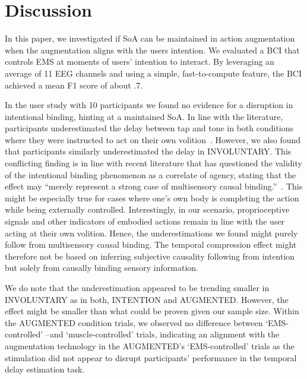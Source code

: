 \section{Discussion}
In this paper, we investigated if SoA can be maintained in action augmentation when the augmentation aligns with the users intention. We evaluated a BCI that controls EMS at moments of users' intention to interact. By leveraging an average of 11 EEG channels and using a simple, fast-to-compute feature, the BCI achieved a mean F1 score of about .7. 


In the user study with 10 participants we found no evidence for a disruption in intentional binding, hinting at a maintained SoA. In line with the literature, participants underestimated the delay between tap and tone in both conditions where they were instructed to act on their own volition~\cite{Moore2012-dk}. However, we also found that participants similarly underestimated the delay in INVOLUNTARY. This conflicting finding is in line with recent literature that has questioned the validity of the intentional binding phenomenon as a correlate of agency, stating that the effect may ``merely represent a strong case of multisensory causal binding.''~\cite{Suzuki2019-pi, Gutzeit2023-ei, Hoerl2020-my}. This might be especially true for cases where one's own body is completing the action while being externally controlled. Interestingly, in our scenario, proprioceptive signals and other indicators of embodied actions remain in line with the user acting at their own volition. Hence, the underestimations we found might purely follow from multisensory causal binding. The temporal compression effect might therefore not be based on inferring subjective causality following from intention but solely from causally binding sensory information. 

We do note that the underestimation appeared to be trending smaller in INVOLUNTARY as in both, INTENTION and AUGMENTED. However, the effect might be smaller than what could be proven given our sample size. Within the AUGMENTED condition trials, we observed no difference between `EMS-controlled' --and `muscle-controlled' trials, indicating an alignment with the augmentation technology in the AUGMENTED's `EMS-controlled' trials as the stimulation did not appear to disrupt participants' performance in the temporal delay estimation task.

